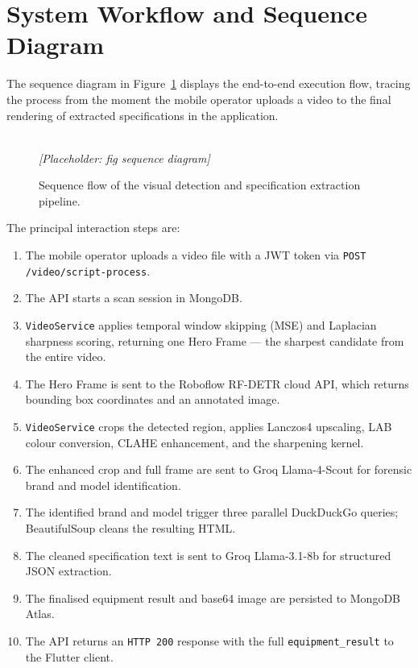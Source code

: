 \section{System Workflow and Sequence Diagram}
\label{sec:ch4-workflow}

The sequence diagram in Figure~\ref{fig:ch4-sequence} displays the end-to-end execution flow, tracing the process from the moment the mobile operator uploads a video to the final rendering of extracted specifications in the application.

\begin{figure}[htbp]
  \centering
  \framebox[\linewidth]{\rule{0pt}{4cm}}
  \\[4pt]
  {\small\textit{[Placeholder: fig sequence diagram]}}  
  
  \caption{Sequence flow of the visual detection and specification extraction pipeline.}
  \label{fig:ch4-sequence}
\end{figure}

The principal interaction steps are:
\begin{enumerate}
  \item The mobile operator uploads a video file with a JWT token via \texttt{POST /video/script-process}.
  \item The API starts a scan session in MongoDB.
  \item \texttt{VideoService} applies temporal window skipping (MSE) and Laplacian sharpness scoring, returning one Hero Frame — the sharpest candidate from the entire video.
  \item The Hero Frame is sent to the Roboflow RF-DETR cloud API, which returns bounding box coordinates and an annotated image.
  \item \texttt{VideoService} crops the detected region, applies Lanczos4 upscaling, LAB colour conversion, CLAHE enhancement, and the sharpening kernel.
  \item The enhanced crop and full frame are sent to Groq Llama-4-Scout for forensic brand and model identification.
  \item The identified brand and model trigger three parallel DuckDuckGo queries; BeautifulSoup cleans the resulting HTML.
  \item The cleaned specification text is sent to Groq Llama-3.1-8b for structured JSON extraction.
  \item The finalised equipment result and base64 image are persisted to MongoDB Atlas.
  \item The API returns an \texttt{HTTP 200} response with the full \texttt{equipment\_result} to the Flutter client.
\end{enumerate}

